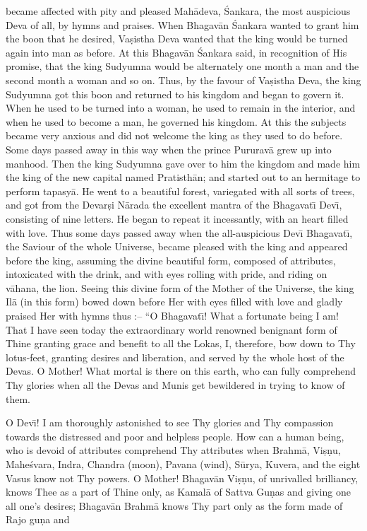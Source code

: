 became affected with pity and pleased Mah\=adeva, \'Sankara, the most auspicious Deva of all, by hymns and praises. When Bhagav\=an \'Sankara wanted to grant him the boon that he desired, Va\d{s}istha Deva wanted that the king would be turned again into man as before. At this Bhagav\=an \'Sankara said, in recognition of His promise, that the king Sudyumna would be alternately one month a man and the second month a woman and so on. Thus, by the favour of Va\d{s}istha Deva, the king Sudyumna got this boon and returned to his kingdom and began to govern it. When he used to be turned into a woman, he used to remain in the interior, and when he used to become a man, he governed his kingdom. At this the subjects became very anxious and did not welcome the king as they used to do before. Some days passed away in this way when the prince Pururav\=a grew up into manhood. Then the king Sudyumna gave over to him the kingdom and made him the king of the new capital named Pratisth\=an; and started out to an hermitage to perform tapasy\=a. He went to a beautiful forest, variegated with all sorts of trees, and got from the Devar\d{s}i N\=arada the excellent mantra of the Bhagavat\={\i} Dev\={\i}, consisting of nine letters. He began to repeat it incessantly, with an heart filled with love. Thus some days passed away when the all-auspicious Dev\={\i} Bhagavat\={\i}, the Saviour of the whole Universe, became pleased with the king and appeared before the king, assuming the divine beautiful form, composed of attributes, intoxicated with the drink, and with eyes rolling with pride, and riding on v\=ahana, the lion. Seeing this divine form of the Mother of the Universe, the king Il\=a (in this form) bowed down before Her with eyes filled with love and gladly praised Her with hymns thus :-- ``O Bhagavat\={\i}! What a fortunate being I am! That I have seen today the extraordinary world renowned benignant form of Thine granting grace and benefit to all the Lokas, I, therefore, bow down to Thy lotus-feet, granting desires and liberation, and served by the whole host of the Devas. O Mother! What mortal is there on this earth, who can fully comprehend Thy glories when all the Devas and Munis get bewildered in trying to know of them.

O Dev\={\i}! I am thoroughly astonished to see Thy glories and Thy compassion towards the distressed and poor and helpless people. How can a human being, who is devoid of attributes comprehend Thy attributes when Brahm\=a, Vi\d{s}\d{n}u, Mahe\'svara, Indra, Chandra (moon), Pavana (wind), S\=urya, Kuvera, and the eight Vasus know not Thy powers. O Mother! Bhagav\=an Vi\d{s}\d{n}u, of unrivalled brilliancy, knows Thee as a part of Thine only, as Kamal\=a of Sattva Gu\d{n}as and giving one all one's desires; Bhagav\=an Brahm\=a knows Thy part only as the form made of Rajo gu\d{n}a and

